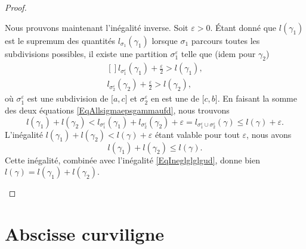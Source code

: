 \begin{proof}
\begin{enumerate}
		      Nous prouvons maintenant l'inégalité inverse. Soit \( \varepsilon>0\). Étant donné que \( l(\gamma_1)\) est le supremum des quantités \( l_{\sigma_1}(\gamma_1)\) lorsque \( \sigma_1\) parcours toutes les subdivisions possibles, il existe une partition \( \sigma_1^{\varepsilon}\) telle que (idem pour \( \gamma_2\))
		      \begin{equation}        \label{EqAllsigmaepsgammaufd}
			      \begin{aligned}[]
				      l_{\sigma_1^{\varepsilon}}(\gamma_1)+\frac{ \varepsilon }{2}>l(\gamma_1), \\
				      l_{\sigma_2^{\varepsilon}}(\gamma_2)+\frac{ \varepsilon }{2}>l(\gamma_2),
			      \end{aligned}
		      \end{equation}
		      où \( \sigma_1^{\varepsilon}\) est une subdivision de \( \mathopen[ a , c \mathclose]\) et \( \sigma_2^{\varepsilon}\) en est une de \( \mathopen[ c , b \mathclose]\). En faisant la somme des deux équations \eqref{EqAllsigmaepsgammaufd}, nous trouvons
		      \begin{equation}
			      l(\gamma_1)+l(\gamma_2)<l_{\sigma_1^{\varepsilon}}(\gamma_1)+l_{\sigma_2^{\varepsilon}}(\gamma_2)+\varepsilon=l_{\sigma_1^{\varepsilon}\cup\sigma_2^{\varepsilon}}(\gamma)\leq l(\gamma)+\varepsilon.
		      \end{equation}
		      L'inégalité \( l(\gamma_1)+l(\gamma_2)<l(\gamma)+\varepsilon\) étant valable pour tout \( \varepsilon\), nous avons
		      \begin{equation}
			      l(\gamma_1)+l(\gamma_2)\leq l(\gamma).
		      \end{equation}
		      Cette inégalité, combinée avec l'inégalité \eqref{EqIneglglglgud}, donne bien \( l(\gamma)=l(\gamma_1)+l(\gamma_2)\).
	\end{enumerate}
\end{proof}


\section{Abscisse curviligne}

